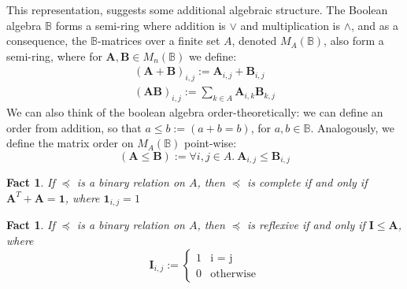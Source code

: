 \documentclass{article}
\theoremstyle{plain}
\newtheorem{fact}[theorem]{Fact}
\theoremstyle{definition}
\theoremstyle{remark}
\newcommand\leqc{\preccurlyeq}
\newcommand\mat[1]{\mathbf #1}
\begin{document}
	This representation, suggests some additional algebraic structure. The Boolean algebra $\mathbb B$ forms a semi-ring where addition is $\lor$ and multiplication is $\land$, and as a consequence, the $\mathbb B$-matrices over a finite set $A$, denoted $M_A(\mathbb B)$, also form a semi-ring, where for $\mat A, \mat B \in M_n(\mathbb B)$ we define:
	\begin{align*}
		(\mat A + \mat B)_{i,j} := \mat A_{i,j} + \mat B_{i,j} \\
		(\mat A \mat B)_{i,j} := \sum_{k \in A} \mat A_{i,k} \mat B_{k,j} 
	\end{align*}
	We can also think of the boolean algebra order-theoretically: we can define an order from addition, so that $a \leq b := (a + b = b)$, for $a, b \in \mathbb B$. Analogously, we define the matrix order on $M_A(\mathbb B)$ point-wise:
	\begin{equation*}
		(\mat A \leq \mat B) := \forall i,j \in A. ~ \mat A_{i,j} \leq \mat B_{i,j}
	\end{equation*}
	
	\begin{fact}
		If $\leqc$ is a binary relation on $A$, then $\leqc$ is complete if and only if $\mat A^T + \mat A = \mathbf 1$, where $\mathbf{1}_{i,j} = 1$
	\end{fact}

	\begin{fact}
		If $\leqc$ is a binary relation on $A$, then $\leqc$ is reflexive if and only if $\mat I \leq \mat A$, where 
		\[ \mat I_{i,j} := \begin{cases} 1 & \text{i = j}\\ 0 &\text{otherwise} \end{cases} \]
	\end{fact}
	
\end{document}

